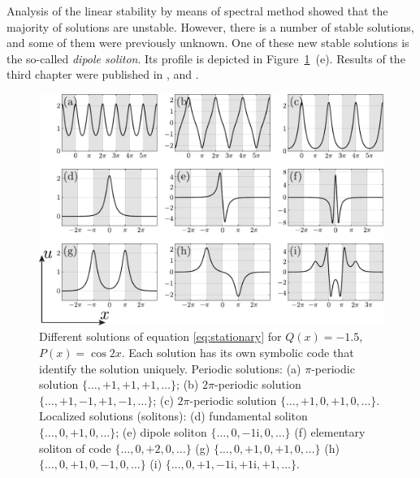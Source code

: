 \documentclass[candidate, href, colorlinks]{disser}
\begin{document}
Analysis of the linear stability by means of spectral method showed that the majority of solutions are unstable.
However, there is a number of stable solutions, and some of them were previously unknown.
One of these new stable solutions is the so-called {\it dipole soliton}.
Its profile is depicted in Figure~\ref{fig:solutions}~(e).
Results of the third chapter were published in \cite{LebedevAlfimovMalomed}, \cite{NizhniNovgorod2016} and \cite{Tashkent2018}.

\begin{figure}[h!]
\centering
	\includegraphics[scale = 1]{../pic/solutions for cosine equation}
	\caption{
		Different solutions of equation \eqref{eq:stationary} for $Q(x) = -1.5$, $P(x) = \cos 2x$.
		Each solution has its own symbolic code that identify the solution uniquely.
		Periodic solutions: (a) $\pi$-periodic solution $\{ \dots, +1, +1, +1, \dots \}$; (b) $2 \pi$-periodic solution $\{ \dots, +1, -1, +1, -1, \dots \}$; (c) $2 \pi$-periodic solution $\{ \dots, +1, 0, +1, 0, \dots \}$.
		Localized solutions (solitons): (d) fundamental soliton $\{ \dots, 0, +1, 0, \dots \}$; (e) dipole soliton $\{ \dots, 0, -1\mathrm{i}, 0, \dots \}$ (f) elementary soliton of code $\{ \dots, 0, +2, 0, \dots \}$ (g) $\{ \dots, 0, +1, 0, +1, 0, \dots \}$ (h) $\{ \dots, 0, +1, 0, -1, 0, \dots \}$ (i) $\{ \dots, 0, +1, -1\mathrm{i}, +1\mathrm{i}, +1, \dots \}$.
	}
\label{fig:solutions}
\end{figure}
\end{document}
